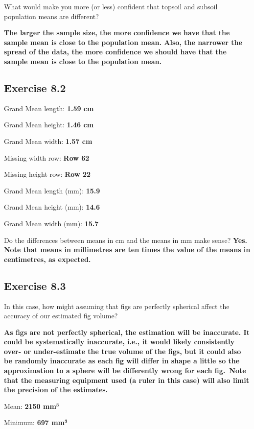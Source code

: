 \documentclass[
  openany]{krantz}
\begin{document}
What would make you more (or less) confident that topsoil and subsoil population means are different?

\textbf{The larger the sample size, the more confidence we have that the sample mean is close to the population mean. Also, the narrower the spread of the data, the more confidence we should have that the sample mean is close to the population mean.}

\hypertarget{exercise-8.2}{%
\subsection{Exercise 8.2}\label{exercise-8.2}}

Grand Mean length: \textbf{1.59 cm}

Grand Mean height: \textbf{1.46 cm}

Grand Mean width: \textbf{1.57 cm}

Missing width row: \textbf{Row 62}

Missing height row: \textbf{Row 22}

Grand Mean length (mm): \textbf{15.9}

Grand Mean height (mm): \textbf{14.6}

Grand Mean width (mm): \textbf{15.7}

Do the differences between means in cm and the means in mm make sense? \textbf{Yes. Note that means in millimetres are ten times the value of the means in centimetres, as expected.}

\hypertarget{exercise-8.3}{%
\subsection{Exercise 8.3}\label{exercise-8.3}}

In this case, how might assuming that figs are perfectly spherical affect the accuracy of our estimated fig volume?

\textbf{As figs are not perfectly spherical, the estimation will be inaccurate. It could be systematically inaccurate, i.e., it would likely consistently over- or under-estimate the true volume of the figs, but it could also be randomly inaccurate as each fig will differ in shape a little so the approximation to a sphere will be differently wrong for each fig.~Note that the measuring equipment used (a ruler in this case) will also limit the precision of the estimates.}

Mean: \textbf{2150 mm\(\mathbf{^3}\)}

Minimum: \textbf{697 mm\(\mathbf{^3}\)}
\end{document}
